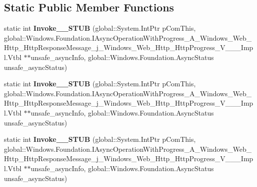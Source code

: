 \subsection*{Static Public Member Functions}
\begin{DoxyCompactItemize}
\item 
\mbox{\label{struct_windows_1_1_foundation_1_1_async_operation_with_progress_completed_handler___a___windows_aed865ee38f1f3fe63b6da8d83d4b4f2_adad799980c651be4bce819ea5cf0b9bd}} 
static int {\bfseries Invoke\+\_\+\+\_\+\+S\+T\+UB} (global\+::\+System.\+Int\+Ptr p\+Com\+This, global\+::\+Windows.\+Foundation.\+I\+Async\+Operation\+With\+Progress\+\_\+\+A\+\_\+\+Windows\+\_\+\+Web\+\_\+\+Http\+\_\+\+Http\+Response\+Message\+\_\+j\+\_\+\+Windows\+\_\+\+Web\+\_\+\+Http\+\_\+\+Http\+Progress\+\_\+\+V\+\_\+\+\_\+\+\_\+\+Impl.\+Vtbl $\ast$$\ast$unsafe\+\_\+async\+Info, global\+::\+Windows.\+Foundation.\+Async\+Status unsafe\+\_\+async\+Status)
\item 
\mbox{\label{struct_windows_1_1_foundation_1_1_async_operation_with_progress_completed_handler___a___windows_aed865ee38f1f3fe63b6da8d83d4b4f2_adad799980c651be4bce819ea5cf0b9bd}} 
static int {\bfseries Invoke\+\_\+\+\_\+\+S\+T\+UB} (global\+::\+System.\+Int\+Ptr p\+Com\+This, global\+::\+Windows.\+Foundation.\+I\+Async\+Operation\+With\+Progress\+\_\+\+A\+\_\+\+Windows\+\_\+\+Web\+\_\+\+Http\+\_\+\+Http\+Response\+Message\+\_\+j\+\_\+\+Windows\+\_\+\+Web\+\_\+\+Http\+\_\+\+Http\+Progress\+\_\+\+V\+\_\+\+\_\+\+\_\+\+Impl.\+Vtbl $\ast$$\ast$unsafe\+\_\+async\+Info, global\+::\+Windows.\+Foundation.\+Async\+Status unsafe\+\_\+async\+Status)
\item 
\mbox{\label{struct_windows_1_1_foundation_1_1_async_operation_with_progress_completed_handler___a___windows_aed865ee38f1f3fe63b6da8d83d4b4f2_adad799980c651be4bce819ea5cf0b9bd}} 
static int {\bfseries Invoke\+\_\+\+\_\+\+S\+T\+UB} (global\+::\+System.\+Int\+Ptr p\+Com\+This, global\+::\+Windows.\+Foundation.\+I\+Async\+Operation\+With\+Progress\+\_\+\+A\+\_\+\+Windows\+\_\+\+Web\+\_\+\+Http\+\_\+\+Http\+Response\+Message\+\_\+j\+\_\+\+Windows\+\_\+\+Web\+\_\+\+Http\+\_\+\+Http\+Progress\+\_\+\+V\+\_\+\+\_\+\+\_\+\+Impl.\+Vtbl $\ast$$\ast$unsafe\+\_\+async\+Info, global\+::\+Windows.\+Foundation.\+Async\+Status unsafe\+\_\+async\+Status)
$$
\end{DoxyCompactItemize}
